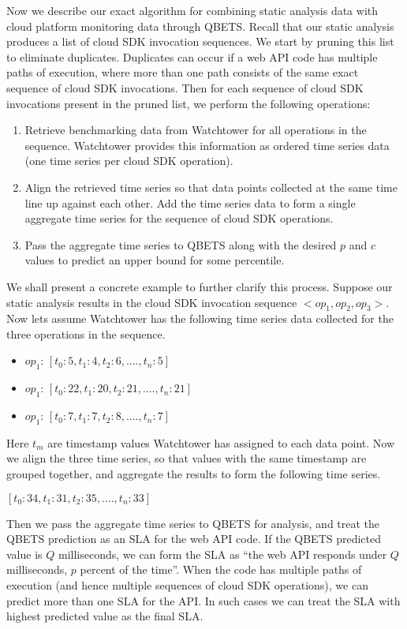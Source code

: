 Now we describe our exact algorithm for combining static analysis data with cloud platform monitoring 
data through QBETS. Recall that our static analysis produces a list of cloud SDK invocation sequences.
We start by pruning this list to eliminate duplicates. Duplicates can occur if a web API code has
multiple paths of execution, where more than one path consists of the same exact sequence of cloud 
SDK invocations. Then for each sequence of cloud SDK invocations present in the pruned list, we
perform the following operations:

\begin{enumerate}
\item Retrieve benchmarking data from Watchtower for all operations in the sequence. Watchtower provides
this information as ordered time series data (one time series per cloud SDK operation).
\item Align the retrieved time series so that data points collected at the same time line up against each other.
Add the time series data to form a single aggregate time series for the sequence of cloud SDK operations.
\item Pass the aggregate time series to QBETS along with the desired $p$ and $c$ values to predict an
upper bound for some percentile. 
\end{enumerate}

We shall present a concrete example to further clarify this process. Suppose our static analysis results in the
cloud SDK invocation sequence $<op_{1},op_{2},op_{3}>$. Now lets assume Watchtower has the following
time series data collected for the three operations in the sequence.

\begin{itemize}
\item $op_{1}$: $[t_{0}: 5, t_{1}: 4, t_{2}: 6, ...., t_{n}: 5]$
\item $op_{1}$: $[t_{0}: 22, t_{1}: 20, t_{2}: 21, ...., t_{n}: 21]$
\item $op_{1}$: $[t_{0}: 7, t_{1}: 7, t_{2}: 8, ...., t_{n}: 7]$
\end{itemize}

Here $t_{m}$ are timestamp values Watchtower has assigned to each data point. Now we align the three
time series, so that values with the same timestamp are grouped together, and aggregate the results
to form the following time series.

$[t_{0}: 34, t_{1}: 31, t_{2}: 35, ...., t_{n}: 33]$

Then we pass the aggregate time series to QBETS for analysis, and
treat the QBETS prediction as an SLA for the web API code.
If the QBETS predicted value is $Q$ milliseconds, we can form the SLA as ``the web API responds 
under $Q$ milliseconds, $p$ percent of the time''. When the code has multiple paths of execution (and
hence multiple sequences of cloud SDK operations), we can predict more than one SLA for the API. In
such cases we can treat the SLA with highest predicted value as the final SLA.

